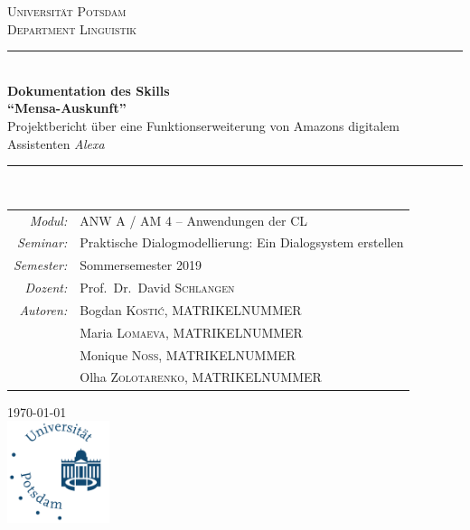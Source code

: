 \documentclass[12pt]{article}
\begin{document}
\begin{titlepage}
\begin{singlespacing}
\newcommand{\HRule}{\rule{\linewidth}{0.5mm}} %

\begin{center}
\textsc{\LARGE Universität Potsdam}\\[0.5cm]
\textsc{\large Department Linguistik}\\[1.5cm]
\HRule \\[0.4cm]
{\huge \bfseries Dokumentation des Skills\\[0.2cm] “Mensa-Auskunft”}\\[0.5cm]
{\Large Projektbericht über eine Funktionserweiterung von Amazons digitalem Assistenten \emph{Alexa}}\\[0.2cm]
\HRule \\[1cm]

\end{center}
\begin{tabular}{rl}
	\emph{Modul:}&
	ANW A / AM 4 – Anwendungen der CL\\[0.1cm]
	\emph{Seminar:}&
	Praktische Dialogmodellierung: Ein Dialogsystem erstellen\\[0.1cm]
	\emph{Semester:}&
	Sommersemester 2019\\[0.1cm]
	\emph{Dozent:}&
	Prof.~Dr.~David \textsc{Schlangen}\\[2cm]

	\emph{Autoren:}&
	Bogdan \textsc{Kostić},
	MATRIKELNUMMER\\&
	
	Maria \textsc{Lomaeva},
	MATRIKELNUMMER\\&
	
	Monique \textsc{Noss},
	MATRIKELNUMMER\\&
	
	Olha \textsc{Zolotarenko},
	MATRIKELNUMMER\\[1.75cm]
\end{tabular}

\begin{center}
{\large \today}\\[2cm]

\includegraphics[width=3cm]{uni_potsdam_logo.pdf}\\[1cm]
\end{center}

\end{singlespacing}
\end{titlepage}
\end{document}
